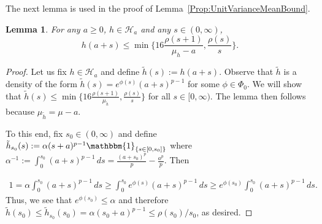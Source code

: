 \documentclass[a4paper,12pt]{article}
\newtheorem{lemma}[theorem]{Lemma}
\begin{document}
The next lemma is used in the proof of Lemma~\ref{Prop:UnitVarianceMeanBound}.
\begin{lemma}
  \label{Lem:MeanConstrainedSupBound}
For any $a \geq 0$, $h \in \mathcal{H}_{a}$ and any $s \in (0, \infty)$, 
  \[
   h(a + s) \leq \min\biggl\{ 16 \frac{\rho(s+1)}{\mu_h - a}, \frac{\rho(s)}{s} \biggr\}.
  \]
\end{lemma}


\begin{proof}

  Let us fix $h \in \mathcal{H}_{a}$ and define $\tilde{h}(s) := h(a + s)$. Observe that $\tilde{h}$ is a density of the form $\tilde{h}(s) = e^{\phi(s)} (a + s)^{p-1}$ for some $\phi \in \Phi_0$.  We will show that $\tilde{h}(s) \leq \min \bigl\{ 16 \frac{\rho(s+1)}{\mu_{\tilde{h}}}, \frac{\rho(s)}{s} \bigr\}$ for all $s \in [0, \infty)$. The lemma then follows because $\mu_{\tilde{h}} = \mu - a$.

  To this end, fix $s_0 \in (0, \infty)$ and define $\tilde{h}_{s_0}(s) := \alpha(s+a)^{p-1}\mathbbm{1}_{\{s \in [0, s_0]\}}$ where $\alpha^{-1} := \int_0^{s_0} (a + s)^{p-1} \, ds = \frac{(a + s_0)^p}{p} - \frac{a^p}{p}$.  Then

  \begin{align*}
   1 = \alpha \int_0^{s_0} (a + s)^{p-1} \, ds \geq \int_0^{s_0} e^{\phi(s)} (a + s)^{p-1} \, ds 
      \geq e^{\phi(s_0)} \int_0^{s_0} (a + s)^{p-1} \, ds.
  \end{align*}
Thus, we see that $e^{\phi(s_0)} \leq \alpha$ and therefore $\tilde{h}(s_0) \leq \tilde{h}_{s_0}(s_0) = \alpha (s_0 + a)^{p-1} \leq \rho(s_0)/s_0$, as desired. 


\end{proof}
\end{document}
